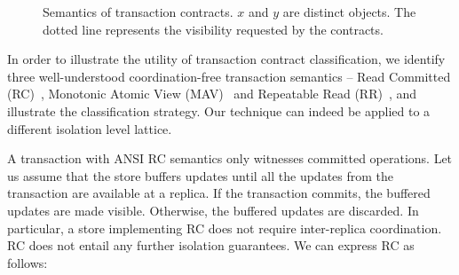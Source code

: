\begin{figure}
\centering
{}
\hfill
{}
\hfill
{}
\caption{Semantics of transaction contracts. $x$ and $y$ are distinct objects.
The dotted line represents the visibility requested by the contracts.}
\label{fig:transaction}
\end{figure}

In order to illustrate the utility of transaction contract classification, we
identify three well-understood coordination-free transaction semantics -- Read
Committed (RC)~\cite{}, Monotonic Atomic View (MAV)~\cite{} and Repeatable Read
(RR)~\cite{}, and illustrate the classification strategy. Our technique can
indeed be applied to a different isolation level lattice.

A transaction with ANSI RC semantics only witnesses committed operations. Let
us assume that the store buffers updates until all the updates from the
transaction are available at a replica. If the transaction commits, the
buffered updates are made visible. Otherwise, the buffered updates are
discarded. In particular, a store implementing RC does not require
inter-replica coordination. RC does not entail any further isolation
guarantees. We can express RC as follows:

